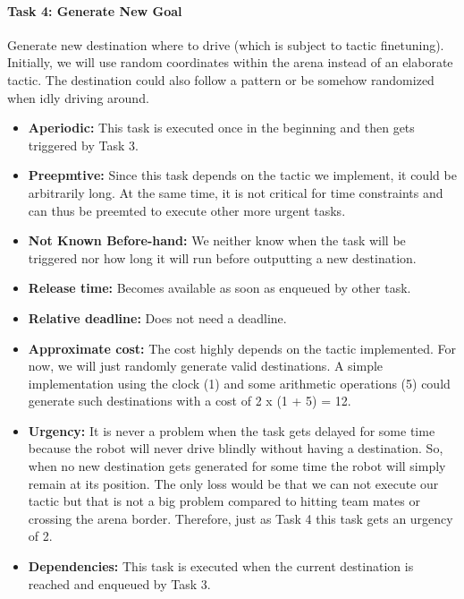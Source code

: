 \documentclass[12pt]{article}
\begin{document}
\paragraph{Task 4: Generate New Goal}
Generate new destination where to drive (which is subject to tactic finetuning). Initially, we will use random coordinates within the arena instead of an elaborate tactic. The destination could also follow a pattern or be somehow randomized when idly driving around.
  \begin{itemize}
	\item \textbf{Aperiodic:} This task is executed once in the beginning and then gets triggered by Task 3.
	\item \textbf{Preepmtive:} Since this task depends on the tactic we implement, it could be arbitrarily long. At the same time, it is not critical for time constraints and can thus be preemted to execute other more urgent tasks.
  	\item \textbf{Not Known Before-hand:} We neither know when the task will be triggered nor how long it will run before outputting a new destination.
  	\item \textbf{Release time:} Becomes available as soon as enqueued by other task.
  	\item \textbf{Relative deadline:} Does not need a deadline.
  	\item \textbf{Approximate cost:} The cost highly depends on the tactic implemented. For now, we will just randomly generate valid destinations. A simple implementation using the clock (1) and some arithmetic operations (5) could generate such destinations with a cost of 2 x (1 + 5) = 12.
  	\item \textbf{Urgency:} It is never a problem when the task gets delayed for some time because the robot will never drive blindly without having a destination. So, when no new destination gets generated for some time the robot will simply remain at its position. The only loss would be that we can not execute our tactic but that is not a big problem compared to hitting team mates or crossing the arena border. Therefore, just as Task 4 this task gets an urgency of 2.
  	\item \textbf{Dependencies:} This task is executed when the current destination is reached and enqueued by Task 3.
   	\end{itemize}
\end{document}
